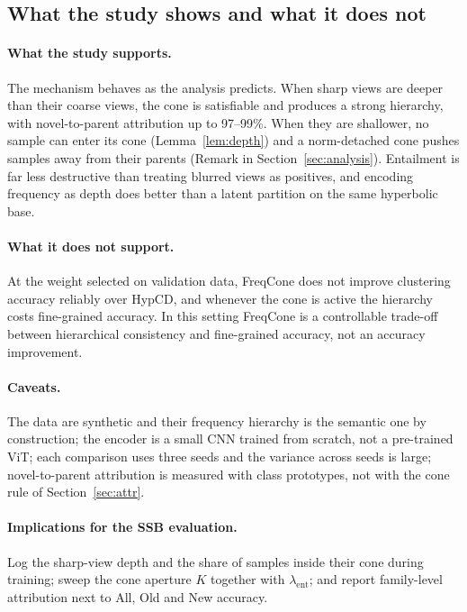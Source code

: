 \documentclass[10pt]{article}
\begin{document}
\subsection{What the study shows and what it does not}
\paragraph{What the study supports.} The mechanism behaves as the analysis predicts. When sharp views are deeper
than their coarse views, the cone is satisfiable and produces a strong hierarchy, with novel-to-parent
attribution up to 97--99\%. When they are shallower, no sample can enter its cone (Lemma~\ref{lem:depth}) and a
norm-detached cone pushes samples away from their parents (Remark in Section~\ref{sec:analysis}). Entailment is
far less destructive than treating blurred views as positives, and encoding frequency as depth does better than a
latent partition on the same hyperbolic base.

\paragraph{What it does not support.} At the weight selected on validation data, FreqCone does not improve
clustering accuracy reliably over HypCD, and whenever the cone is active the hierarchy costs fine-grained
accuracy. In this setting FreqCone is a controllable trade-off between hierarchical consistency and fine-grained
accuracy, not an accuracy improvement.

\paragraph{Caveats.} The data are synthetic and their frequency hierarchy is the semantic one by construction; the
encoder is a small CNN trained from scratch, not a pre-trained ViT; each comparison uses three seeds and the
variance across seeds is large; novel-to-parent attribution is measured with class prototypes, not with the cone
rule of Section~\ref{sec:attr}.

\paragraph{Implications for the SSB evaluation.} Log the sharp-view depth and the share of samples inside their
cone during training; sweep the cone aperture $K$ together with $\lambda_{\mathrm{ent}}$; and report family-level
attribution next to All, Old and New accuracy.
\end{document}
